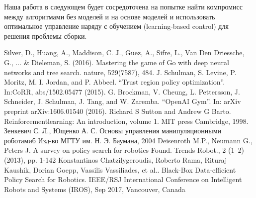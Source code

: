 \documentclass[a4paper,12pt]{article}
\begin{document}
Наша работа в следующем будет сосредоточена на попытке найти компромисс между алгоритмами без моделей и на основе моделей и использовать оптимальное управление наряду с обучением (learning-based control) для решения проблемы сборки.
\newpage
\begin{thebibliography}{9}
     Silver, D., Huang, A., Maddison, C. J., Guez, A., Sifre, L., Van Den Driessche, G., ... & Dieleman, S. (2016). Mastering the game of Go with deep neural networks and tree search. nature, 529(7587), 484.
       J. Schulman, S. Levine, P. Moritz, M. I. Jordan, and P. Abbeel. “Trust region policy optimization”. In:CoRR, abs/1502.05477 (2015).
     G. Brockman, V. Cheung, L. Pettersson, J. Schneider, J. Schulman, J. Tang, and W. Zaremba. “OpenAI Gym”. In: arXiv preprint arXiv:1606.01540 (2016).
     Richard S Sutton and Andrew G Barto. Reinforcementlearning: An introduction, volume 1. MIT press Cambridge, 1998.
     Зенкевич С. Л., Ющенко А. С. Основы управления манипуляционными роботамиб Изд-во МГТУ им. Н. Э. Баумана, 2004
     Deisenroth M.P., Neumann G., Peters J. A survey on policy search for robotics Found. Trends Robot., 2 (1–2) (2013), pp. 1-142
     Konstantinos Chatzilygeroudis, Roberto Rama, Rituraj Kaushik, Dorian Goepp, Vassilis Vassiliades, et al.. Black-Box Data-efficient Policy Search for Robotics. IEEE/RSJ International Conference on Intelligent Robots and Systems (IROS), Sep 2017, Vancouver, Canada

\end{thebibliography}
\end{document}
